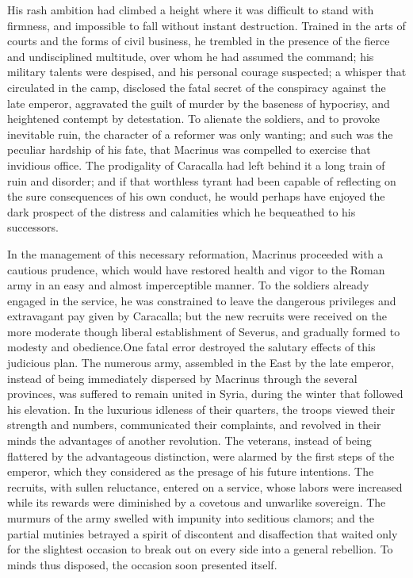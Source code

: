 
His rash ambition had climbed a height where it was difficult to
stand with firmness, and impossible to fall without instant
destruction. Trained in the arts of courts and the forms of civil
business, he trembled in the presence of the fierce and
undisciplined multitude, over whom he had assumed the command;
his military talents were despised, and his personal courage
suspected; a whisper that circulated in the camp, disclosed the
fatal secret of the conspiracy against the late emperor,
aggravated the guilt of murder by the baseness of hypocrisy, and
heightened contempt by detestation. To alienate the soldiers, and
to provoke inevitable ruin, the character of a reformer was only
wanting; and such was the peculiar hardship of his fate, that
Macrinus was compelled to exercise that invidious office. The
prodigality of Caracalla had left behind it a long train of ruin
and disorder; and if that worthless tyrant had been capable of
reflecting on the sure consequences of his own conduct, he would
perhaps have enjoyed the dark prospect of the distress and
calamities which he bequeathed to his successors.

In the management of this necessary reformation, Macrinus
proceeded with a cautious prudence, which would have restored
health and vigor to the Roman army in an easy and almost
imperceptible manner. To the soldiers already engaged in the
service, he was constrained to leave the dangerous privileges and
extravagant pay given by Caracalla; but the new recruits were
received on the more moderate though liberal establishment of
Severus, and gradually formed to modesty and obedience.\footnotemark[45] One
fatal error destroyed the salutary effects of this judicious
plan. The numerous army, assembled in the East by the late
emperor, instead of being immediately dispersed by Macrinus
through the several provinces, was suffered to remain united in
Syria, during the winter that followed his elevation. In the
luxurious idleness of their quarters, the troops viewed their
strength and numbers, communicated their complaints, and revolved
in their minds the advantages of another revolution. The
veterans, instead of being flattered by the advantageous
distinction, were alarmed by the first steps of the emperor,
which they considered as the presage of his future intentions.
The recruits, with sullen reluctance, entered on a service, whose
labors were increased while its rewards were diminished by a
covetous and unwarlike sovereign. The murmurs of the army swelled
with impunity into seditious clamors; and the partial mutinies
betrayed a spirit of discontent and disaffection that waited only
for the slightest occasion to break out on every side into a
general rebellion. To minds thus disposed, the occasion soon
presented itself.


